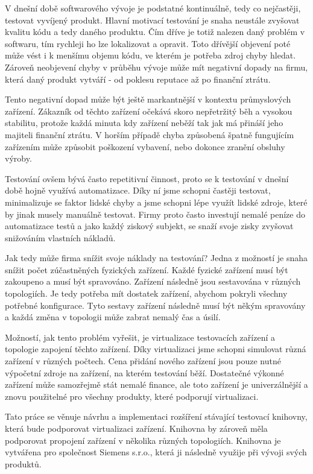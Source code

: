 \begin{introduction}
V dnešní době softwarového vývoje je podstatné kontinuálně, tedy co nejčastěji, testovat vyvíjený produkt. Hlavní motivací testování je snaha neustále zvyšovat kvalitu kódu a tedy daného produktu. Čím dříve je totiž nalezen daný problém v softwaru, tím rychleji ho lze lokalizovat a opravit. Toto dřívější objevení poté může vést i k menšímu objemu kódu, ve kterém je potřeba zdroj chyby hledat. Zároveň neobjevení chyby v průběhu vývoje může mít negativní dopady na firmu, která daný produkt vytváří - od poklesu reputace až po finanční ztrátu.

Tento negativní dopad může být ještě markantnější v kontextu průmyslových zařízení. Zákazník od těchto zařízení očekává skoro nepřetržitý běh a vysokou stabilitu, protože každá minuta kdy zařízení neběží tak jak má přináší jeho majiteli finanční ztrátu. V horším případě chyba způsobená špatně fungujícím zařízením může způsobit poškození vybavení, nebo dokonce zranění obsluhy výroby. 

Testování ovšem bývá často repetitivní činnost, proto se k testování v dnešní době hojně využívá automatizace. Díky ní jsme schopni častěji testovat, minimalizuje se faktor lidské chyby a jsme schopni lépe využít lidské zdroje, které by jinak musely manuálně testovat. Firmy proto často investují nemalé peníze do automatizace testů a jako každý ziskový subjekt, se snaží svoje zisky zvyšovat snižováním vlastních nákladů. 

Jak tedy může firma snížit svoje náklady na testování? Jedna z možností je snaha snížit počet zúčastněných fyzických zařízení. Každé fyzické zařízení musí být zakoupeno a musí být spravováno. Zařízení následně jsou sestavována v různých topologiích. Je tedy potřeba mít dostatek zařízení, abychom pokryli všechny potřebné konfigurace. Tyto sestavy zařízení následně musí být někým spravovány a každá změna v topologii může zabrat nemalý čas a úsilí.

Možností, jak tento problém vyřešit, je virtualizace testovacích zařízení a topologie zapojení těchto zařízení. Díky virtualizaci jsme schopni simulovat různá zařízení v různých počtech. Cena přidání nového zařízení jsou pouze nutné výpočetní zdroje na zařízení, na kterém testování běží. Dostatečné výkonné zařízení může samozřejmě stát nemalé finance, ale toto zařízení je univerzálnější a znovu použitelné pro všechny produkty, které podporují virtualizaci.

Tato práce se věnuje návrhu a implementaci rozšíření stávající testovací knihovny, která bude podporovat virtualizaci zařízení. Knihovna by zároveň měla podporovat propojení zařízení v několika různých topologiích. Knihovna je vytvářena pro společnost Siemens s.r.o., která ji následně využije při vývoji svých produktů. 


\end{introduction}
